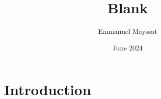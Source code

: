 \documentclass{article}
\title{Blank}
\author{Emmanuel Mayssat}
\date{June 2024}
\begin{document}
\maketitle

\section{Introduction}
\end{document}
